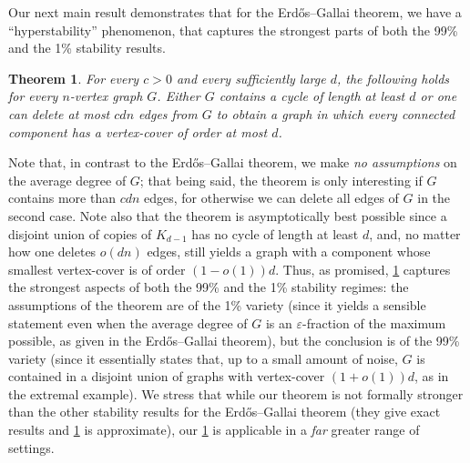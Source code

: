 \documentclass[10pt]{article}
\newtheorem{theorem}{Theorem}[section]
\theoremstyle{definition}
\begin{document}
Our next main result demonstrates that for the Erd\H os--Gallai theorem, we have a ``hyperstability'' phenomenon, that captures the strongest parts of both the 99\% and the 1\% stability results.
\begin{theorem}\label{thm:EG hyperstability}
For every $c>0$ and every sufficiently large $d$, the following holds for every $n$-vertex graph $G$. Either $G$ contains a cycle of length at least $d$ or one can delete at most $c dn$ edges from $G$ to obtain a graph in which every connected component has a vertex-cover of order at most $d$. 
\end{theorem}
Note that, in contrast to the Erd\H os--Gallai theorem, we make \emph{no assumptions} on the average degree of $G$; that being said, the theorem is only interesting if $G$ contains more than $cdn$ edges, for otherwise we can delete all edges of $G$ in the second case. Note also that the theorem is asymptotically best possible since a disjoint union of copies of $K_{d-1}$ has no cycle of length at least $d$, and, no matter how one deletes $o(dn)$ edges, still yields a graph with a component whose smallest vertex-cover is of order $(1-o(1))d$. Thus, as promised, \cref{thm:EG hyperstability} captures the strongest aspects of both the 99\% and the 1\% stability regimes: the assumptions of the theorem are of the 1\% variety (since it yields a sensible statement even when the average degree of $G$ is an $\varepsilon$-fraction of the maximum possible, as given in the Erd\H os--Gallai theorem), but the conclusion is of the 99\% variety (since it essentially states that, up to a small amount of noise, $G$ is contained in a disjoint union of graphs with vertex-cover $(1+o(1))d$, as in the extremal example). We stress that while our theorem is not formally stronger than the other stability results for the Erd\H os--Gallai theorem \cite{MR4078813,MR3548292,MR3777040} (they give exact results and \cref{thm:EG hyperstability} is approximate), our \cref{thm:EG hyperstability} is applicable in a \emph{far} greater range of settings. 

\end{document}
